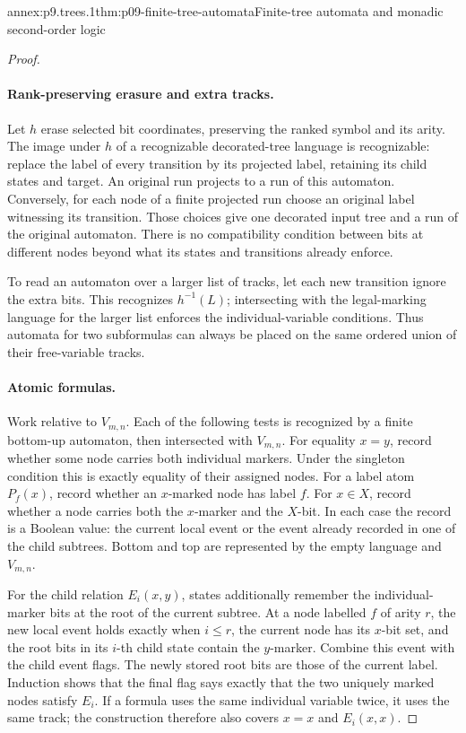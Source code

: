 \begin{annexitem}{annex:p9.trees.1}{thm:p09-finite-tree-automata}{Finite-tree automata and monadic second-order logic}
\begin{proof}
\paragraph{Rank-preserving erasure and extra tracks.}
Let \(h\) erase selected bit coordinates, preserving the ranked symbol
and its arity.  The image under \(h\) of a recognizable decorated-tree
language is recognizable: replace the label of every transition by
its projected label, retaining its child states and target.
An original run projects to a run of this automaton.
Conversely, for each node of a finite projected run choose an
original label witnessing its transition.  Those choices give one
decorated input tree and a run of the original automaton.
There is no compatibility condition between bits at different nodes
beyond what its states and transitions already enforce.

To read an automaton over a larger list of tracks, let each new
transition ignore the extra bits.  This recognizes \(h^{-1}(L)\);
intersecting with the legal-marking language for the larger list
enforces the individual-variable conditions.
Thus automata for two subformulas can always be placed on the same
ordered union of their free-variable tracks.

\paragraph{Atomic formulas.}
Work relative to \(V_{m,n}\).
Each of the following tests is recognized by a finite bottom-up
automaton, then intersected with \(V_{m,n}\).
For equality \(x=y\), record whether some node carries both individual
markers.  Under the singleton condition this is exactly equality
of their assigned nodes.
For a label atom \(P_f(x)\), record whether an \(x\)-marked node
has label \(f\).
For \(x\in X\), record whether a node carries both the \(x\)-marker
and the \(X\)-bit.
In each case the record is a Boolean value: the current local event
or the event already recorded in one of the child subtrees.
Bottom and top are represented by the empty language and \(V_{m,n}\).

For the child relation \(E_i(x,y)\), states additionally remember
the individual-marker bits at the root of the current subtree.
At a node labelled \(f\) of arity \(r\), the new local event holds
exactly when \(i\leq r\), the current node has its \(x\)-bit set,
and the root bits in its \(i\)-th child state contain the \(y\)-marker.
Combine this event with the child event flags.
The newly stored root bits are those of the current label.
Induction shows that the final flag says exactly that the two
uniquely marked nodes satisfy \(E_i\).
If a formula uses the same individual variable twice, it uses the
same track; the construction therefore also covers \(x=x\) and
\(E_i(x,x)\).


\end{proof}
\end{annexitem}

